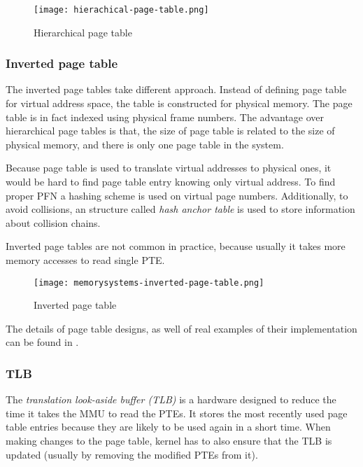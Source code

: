 \begin{figure}[h]
  \centering
  \texttt{[image: hierachical-page-table.png]}
  \caption{Hierarchical page table}
  \label{fig:hierarchical_page_table}
\end{figure}


\subsubsection{Inverted page table}

The inverted page tables take different approach.
Instead of defining page table for virtual address space, the table is constructed for physical memory.
The page table is in fact indexed using physical frame numbers.
The advantage over hierarchical page tables is that, the size of page table is related to the size of physical memory, and there is only one page table in the system.

Because page table is used to translate virtual addresses to physical ones, it would be hard to find page table entry knowing only virtual address.
To find proper PFN a hashing scheme is used on virtual page numbers.
Additionally, to avoid collisions, an structure called {\it hash anchor table} is used to store information about collision chains.

Inverted page tables are not common in practice, because usually it takes more memory accesses to read single PTE.

\begin{figure}[h]
  \centering
  \texttt{[image: memorysystems-inverted-page-table.png]}
  \caption{Inverted page table \cite{memorysystems}}
  \label{fig:memorysystems:inverted_page_table}
\end{figure}

The details of page table designs, as well of real examples of their implementation can be found in \cite{memorysystems}.

\subsubsection{TLB}

The {\it translation look-aside buffer (TLB)} is a hardware designed to reduce the time it takes the MMU to read the PTEs.
It stores the most recently used page table entries because they are likely to be used again in a short time.
When making changes to the page table, kernel has to also ensure that the TLB is updated (usually by removing the modified PTEs from it).

